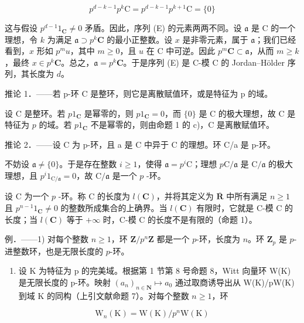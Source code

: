 \[
p ^ {d - k - 1} p ^ {k} \mathrm{C} = p ^ {d - k - 1} p ^ {k + 1} \mathrm{C} = \{0 \}
\]

这与假设 \(p^{d-1}1_{\mathbf{C}} \neq 0\) 矛盾。因此，序列 (E) 的元素两两不同。设 \(\mathfrak{a}\) 是 C 的一个理想，令 \(k\) 为满足 \(\mathfrak{a} \supset p^k\mathbf{C}\) 的最小正整数。设 \(x\) 是非零元素，属于 \(\mathfrak{a}\)；我们已经看到，\(x\) 形如 \(p^m u\)，其中 \(m \geqslant 0\)，且 \(u\) 在 C 中可逆。因此 \(p^m\mathbf{C} \subset \mathfrak{a}\)，从而 \(m \geqslant k\)，最终 \(x \in p^k\mathbf{C}\)。总之，\(\mathfrak{a} = p^k\mathbf{C}\)。于是序列 (E) 是 C-模 C 的 Jordan–Hölder 序列，其长度为 \(d\)。

推论 1．——若 p-环 C 是整环，则它是离散赋值环，或是特征为 p 的域。

设 C 是整环。若 \(p1_{\mathbf{C}}\) 是幂零的，则 \(p1_{\mathbf{C}} = 0\)，而 \(\{0\}\) 是 C 的极大理想，故 C 是特征为 \(p\) 的域。若 \(p1_{\mathbf{C}}\) 不是幂零的，则由命题 1 的 c)，C 是离散赋值环。

推论 2．——设 C 为 p-环，且 a 是 C 中异于 C 的理想。环 C/a 是 p-环。

不妨设 \(\mathfrak{a} \neq \{0\}\)。于是存在整数 \(i \geqslant 1\)，使得 \(\mathfrak{a} = p^i\mathrm{C}\)；理想 \(p\mathrm{C} / \mathfrak{a}\) 是 \(\mathrm{C} / \mathfrak{a}\) 的极大理想，且 \(p^i1_{\mathrm{C} / \mathfrak{a}} = 0\)，故 \(\mathrm{C} / \mathfrak{a}\) 是一个 \(p\) -环。

设 C 为一个 \(p\) -环。称 C 的长度为 \(l(\mathbf{C})\)，并将其定义为 \(\overline{\mathbf{R}}\) 中所有满足 \(n \geqslant 1\) 且 \(p^{n-1}1_{\mathbf{C}} \neq 0\) 的整数所成集合的上确界。当 \(l(\mathbf{C})\) 有限时，它就是 C-模 C 的长度；当 \(l(\mathbf{C})\) 等于 \(+\infty\) 时，C-模 C 的长度不是有限的（命题 1）。

例．——1) 对每个整数 \(n \geqslant 1\)，环 \(\mathbf{Z}/p^{n}\mathbf{Z}\) 都是一个 \(p\)-环，长度为 \(n\)。环 \(\mathbf{Z}_{p}\) 是 \(p\)-进整数环，也是无限长度的 \(p\)-环。

\begin{enumerate}
\def\labelenumi{\arabic{enumi})}
\setcounter{enumi}{1}
\tightlist
\item
  设 K 为特征为 p 的完美域。根据第 1 节第 8 号命题 8，Witt 向量环 W(K) 是无限长度的 p-环。映射 \((a_{n})_{n\in\mathbf{N}} \mapsto a_{0}\) 通过取商诱导出从 W(K)/pW(K) 到域 K 的同构（上引文献命题 7）。对每个整数 \(n \geqslant 1\)，环
\end{enumerate}

\[
\mathrm{W} _ {n} (\mathrm{K}) = \mathrm{W} (\mathrm{K}) / p ^ {n} \mathrm{W} (\mathrm{K})
\]

